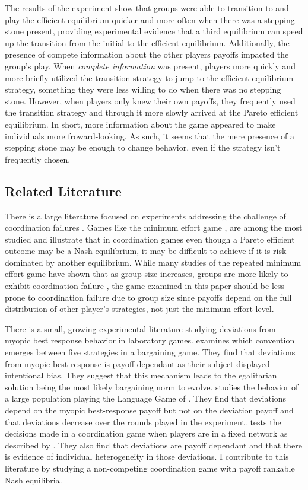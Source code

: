 The results of the experiment show that groups were able to transition to and play the efficient equilibrium quicker and more often when there was a stepping stone present, providing experimental evidence that a third equilibrium can speed up the transition from the initial to the efficient equilibrium. Additionally, the presence of compete information about the other players payoffs impacted the group's play. When \textit{complete information} was present, players more quickly and more briefly utilized the transition strategy to jump to the efficient equilibrium strategy, something they were less willing to do when there was no stepping stone. However, when players only knew their own payoffs, they frequently used the transition strategy and through it more slowly arrived at the Pareto efficient equilibrium. In short, more information about the game appeared to make individuals more froward-looking. As such, it seems that the mere presence of a stepping stone may be enough to change behavior, even if the strategy isn't frequently chosen. 

\subsection*{Related Literature}
There is a large literature focused on experiments addressing the challenge of coordination failures \citep{devetag2007and}. Games like the minimum effort game \citep{van1990tacit}, are among the most studied and illustrate that in coordination games even though a Pareto efficient outcome may be a Nash equilibrium, it may be difficult to achieve if it is risk dominated by another equilibrium. While many studies of the repeated minimum effort game have shown that as group size increases, groups are more likely to exhibit coordination failure \citep{van1990tacit, knez1994creating, goeree2005experimental, DIGIROLAMO2015168}, the game examined in this paper should be less prone to coordination failure due to group size since payoffs depend on the full distribution of other player's strategies, not just the minimum effort level.

There is a small, growing experimental literature studying deviations from myopic best response behavior in laboratory games. \cite{hwang2018conventional} examines which convention emerges between five strategies in a bargaining game. They find that deviations from myopic best response is payoff dependant as their subject displayed intentional bias. They suggest that this mechanism leads to the egalitarian solution being the most likely bargaining norm to evolve. \cite{lim2016experimental} studies the behavior of a large population playing the Language Game of \cite{NEARY2012301}. They find that deviations depend on the myopic best-response payoff but not on the deviation payoff and that deviations decrease over the rounds played in the experiment. \cite{mas2016behavioral} tests the decisions made in a coordination game when players are in a fixed network as described by \cite{Ellison1993}. They also find that deviations are payoff dependant and that there is evidence of individual heterogeneity in those deviations. I contribute to this literature by studying a non-competing coordination game with payoff rankable Nash equilibria.


